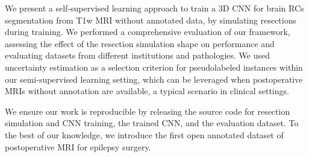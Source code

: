 We present a self-supervised learning approach to train a 3D \ac{CNN} for brain \acp{RC} segmentation from \ac{T1w} \ac{MRI} without annotated data, by simulating resections during training.
We performed a comprehensive evaluation of our framework, assessing the effect of the resection simulation shape on performance and evaluating datasets from different institutions and pathologies.
We used uncertainty estimation as a selection criterion for pseudolabeled instances within our semi-supervised learning setting, which can be leveraged when postoperative \acp{MRI} without annotation are available, a typical scenario in clinical settings.

We ensure our work is reproducible by releasing the source code for resection simulation and \ac{CNN} training, the trained \ac{CNN}, and the evaluation dataset.
To the best of our knowledge, we introduce the first open annotated dataset of postoperative \ac{MRI} for epilepsy surgery.
